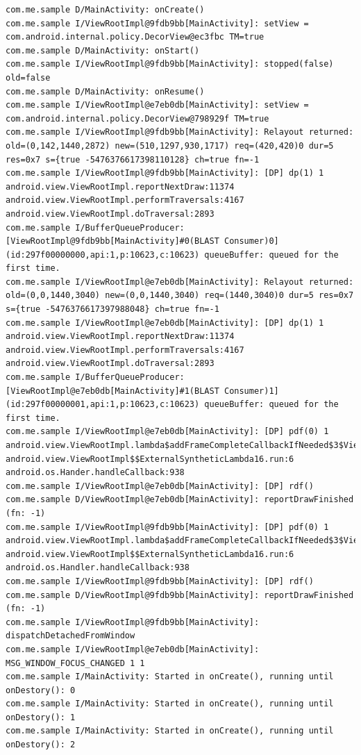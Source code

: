 \documentclass[9pt, b5paper]{article}
\begin{document}
\begin{verbatim}
com.me.sample D/MainActivity: onCreate() 
com.me.sample I/ViewRootImpl@9fdb9bb[MainActivity]: setView = com.android.internal.policy.DecorView@ec3fbc TM=true
com.me.sample D/MainActivity: onStart() 
com.me.sample I/ViewRootImpl@9fdb9bb[MainActivity]: stopped(false) old=false
com.me.sample D/MainActivity: onResume() 
com.me.sample I/ViewRootImpl@e7eb0db[MainActivity]: setView = com.android.internal.policy.DecorView@798929f TM=true
com.me.sample I/ViewRootImpl@9fdb9bb[MainActivity]: Relayout returned: old=(0,142,1440,2872) new=(510,1297,930,1717) req=(420,420)0 dur=5 res=0x7 s={true -5476376617398110128} ch=true fn=-1
com.me.sample I/ViewRootImpl@9fdb9bb[MainActivity]: [DP] dp(1) 1 android.view.ViewRootImpl.reportNextDraw:11374 android.view.ViewRootImpl.performTraversals:4167 android.view.ViewRootImpl.doTraversal:2893 
com.me.sample I/BufferQueueProducer: [ViewRootImpl@9fdb9bb[MainActivity]#0(BLAST Consumer)0](id:297f00000000,api:1,p:10623,c:10623) queueBuffer: queued for the first time.
com.me.sample I/ViewRootImpl@e7eb0db[MainActivity]: Relayout returned: old=(0,0,1440,3040) new=(0,0,1440,3040) req=(1440,3040)0 dur=5 res=0x7 s={true -5476376617397988048} ch=true fn=-1
com.me.sample I/ViewRootImpl@e7eb0db[MainActivity]: [DP] dp(1) 1 android.view.ViewRootImpl.reportNextDraw:11374 android.view.ViewRootImpl.performTraversals:4167 android.view.ViewRootImpl.doTraversal:2893 
com.me.sample I/BufferQueueProducer: [ViewRootImpl@e7eb0db[MainActivity]#1(BLAST Consumer)1](id:297f00000001,api:1,p:10623,c:10623) queueBuffer: queued for the first time.
com.me.sample I/ViewRootImpl@e7eb0db[MainActivity]: [DP] pdf(0) 1 android.view.ViewRootImpl.lambda$addFrameCompleteCallbackIfNeeded$3$ViewRootImpl:4969 android.view.ViewRootImpl$$ExternalSyntheticLambda16.run:6 android.os.Hander.handleCallback:938 
com.me.sample I/ViewRootImpl@e7eb0db[MainActivity]: [DP] rdf()
com.me.sample D/ViewRootImpl@e7eb0db[MainActivity]: reportDrawFinished (fn: -1) 
com.me.sample I/ViewRootImpl@9fdb9bb[MainActivity]: [DP] pdf(0) 1 android.view.ViewRootImpl.lambda$addFrameCompleteCallbackIfNeeded$3$ViewRootImpl:4969 android.view.ViewRootImpl$$ExternalSyntheticLambda16.run:6 android.os.Handler.handleCallback:938 
com.me.sample I/ViewRootImpl@9fdb9bb[MainActivity]: [DP] rdf()
com.me.sample D/ViewRootImpl@9fdb9bb[MainActivity]: reportDrawFinished (fn: -1) 
com.me.sample I/ViewRootImpl@9fdb9bb[MainActivity]: dispatchDetachedFromWindow
com.me.sample I/ViewRootImpl@e7eb0db[MainActivity]: MSG_WINDOW_FOCUS_CHANGED 1 1
com.me.sample I/MainActivity: Started in onCreate(), running until onDestory(): 0
com.me.sample I/MainActivity: Started in onCreate(), running until onDestory(): 1
com.me.sample I/MainActivity: Started in onCreate(), running until onDestory(): 2


\end{verbatim}
\end{document}
